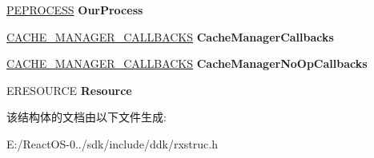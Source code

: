 \begin{DoxyCompactItemize}
\item 
\mbox{\label{struct___r_d_b_s_s___d_a_t_a_a2c9dcca4cf23665df8e6b218e73f9e0f}} 
\hyperlink{struct___e_p_r_o_c_e_s_s}{P\+E\+P\+R\+O\+C\+E\+SS} {\bfseries Our\+Process}
\item 
\mbox{\label{struct___r_d_b_s_s___d_a_t_a_abd42771e5bef08fadfb5515927eebca4}} 
\hyperlink{struct___c_a_c_h_e___m_a_n_a_g_e_r___c_a_l_l_b_a_c_k_s}{C\+A\+C\+H\+E\+\_\+\+M\+A\+N\+A\+G\+E\+R\+\_\+\+C\+A\+L\+L\+B\+A\+C\+KS} {\bfseries Cache\+Manager\+Callbacks}
\item 
\mbox{\label{struct___r_d_b_s_s___d_a_t_a_adcc6cb4e1f7706703499ec15448e124c}} 
\hyperlink{struct___c_a_c_h_e___m_a_n_a_g_e_r___c_a_l_l_b_a_c_k_s}{C\+A\+C\+H\+E\+\_\+\+M\+A\+N\+A\+G\+E\+R\+\_\+\+C\+A\+L\+L\+B\+A\+C\+KS} {\bfseries Cache\+Manager\+No\+Op\+Callbacks}
\item 
\mbox{\label{struct___r_d_b_s_s___d_a_t_a_a0baf6642ed1027ff8b3af9e93c192e53}} 
E\+R\+E\+S\+O\+U\+R\+CE {\bfseries Resource}
\end{DoxyCompactItemize}


该结构体的文档由以下文件生成\+:\begin{DoxyCompactItemize}
\item 
E\+:/\+React\+O\+S-\/0../sdk/include/ddk/rxstruc.\+h\end{DoxyCompactItemize}
